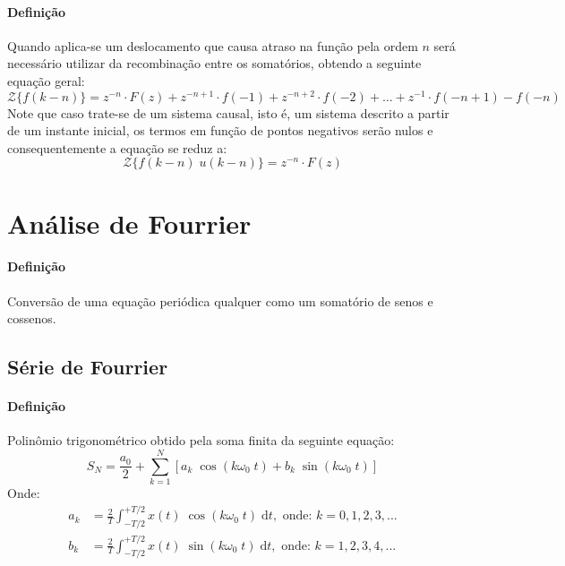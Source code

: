 \documentclass{article}
\begin{document}
    \paragraph{Definição}Quando aplica-se um deslocamento que causa atraso na função pela ordem $n$ será necessário utilizar da recombinação entre os somatórios, obtendo a seguinte equação geral:
    \begin{equation}
        \boxed{
            \mathcal{Z}\{ f(k-n) \} = 
            z^{-n}\cdot F(z) + 
            z^{-n+1}\cdot f(-1) + 
            z^{-n+2}\cdot f(-2) + \dots + 
            z^{-1}\cdot f(-n+1) - 
            f(-n)
        }
    \end{equation}
    Note que caso trate-se de um sistema causal, isto é, um sistema descrito a partir de um instante inicial, os termos em função de pontos negativos serão nulos e consequentemente a equação se reduz a:
    \begin{equation*}
        \mathcal{Z}\{ f(k-n) \; u(k-n)\} = z^{-n}\cdot F(z) 
    \end{equation*}

\section{Análise de Fourrier}
    \paragraph{Definição}Conversão de uma equação periódica qualquer como um somatório de senos e cossenos. 

\subsection{Série de Fourrier}
    \paragraph{Definição}Polinômio trigonométrico obtido pela soma finita da seguinte equação:
    \begin{equation}
    \boxed{S_N = \frac{a_0}{2} + \sum_{k=1}^{N} [a_k\;\cos(k\omega_0\;t) + b_k\;\sin(k\omega_0\;t)]}
    \end{equation}
    Onde:
    \begin{align*}
        a_k &= \frac{2}{T}\int_{-T/2}^{+T/2} x(t)\;\cos(k\omega_0\;t)\;\mathrm{d}t, \text{ onde: } k = 0, 1, 2, 3,...\\
        b_k &= \frac{2}{T}\int_{-T/2}^{+T/2} x(t)\;\sin(k\omega_0\;t)\;\mathrm{d}t, \text{ onde: } k = 1, 2, 3, 4,...\\
    \end{align*}
\end{document}
